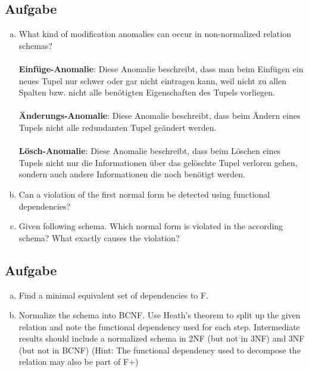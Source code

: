 \documentclass[11pt,a4paper,DIV=9]{scrartcl}
\newcounter{temp}
\newcommand{\aufgabe}[1]{
  \setcounter{temp}{\value{subsection}}
  \setcounter{subsection}{#1}
  \addtocounter{subsection}{-1}
  \subsection{Aufgabe}
  \setcounter{subsection}{\value{temp}}
}
\begin{document}
\aufgabe{3}
  \begin{enumerate}[a.]
    \item What kind of modification anomalies can occur in non-normalized relation schemas? \\\\
    \textbf{Einf\"uge-Anomalie}: Diese Anomalie beschreibt, dass man beim Einf\"ugen ein neues Tupel nur schwer oder gar nicht eintragen kann, weil nicht zu allen Spalten bzw. nicht alle ben\"otigten Eigenschaften des Tupels vorliegen. \\\\
    \textbf{\"Anderungs-Anomalie}: Diese Anomalie beschreibt, dass beim \"Andern eines Tupels nicht alle redundanten Tupel ge\"andert werden. \\\\
    \textbf{L\"osch-Anomalie}: Diese Anomalie beschreibt, dass beim L\"oschen eines Tupels nicht nur die Informationen \"uber das gel\"oschte Tupel verloren gehen, sondern auch andere Informationen die noch ben\"otigt werden.

    \item Can a violation of the first normal form be detected using functional dependencies?
    \item Given following schema. Which normal form is violated in the according schema? What exactly causes the
    violation?
  \end{enumerate}

\aufgabe{4}
  \begin{enumerate}[a.]
    \item Find a minimal equivalent set of dependencies to F.
    \item Normalize the schema into BCNF. Use Heath's theorem to split up the given relation and note the functional dependency used for each step. Intermediate results should include a normalized schema in 2NF (but not in 3NF) and 3NF (but not in BCNF) (Hint: The functional dependency used to decompose the relation may also be part of F+)
  \end{enumerate}
\end{document}
